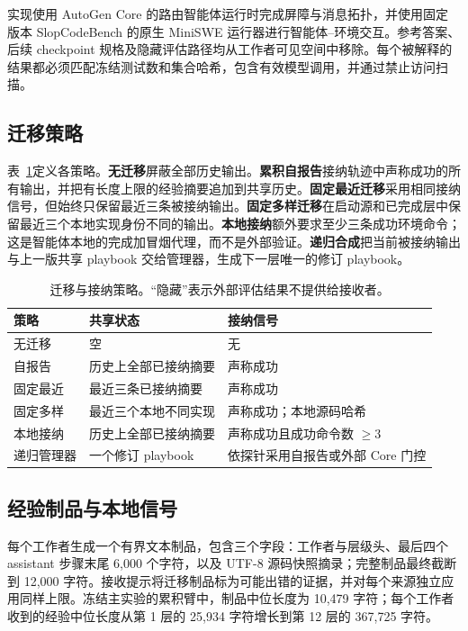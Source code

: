 \documentclass[UTF8,letterpaper,10pt,twocolumn]{ctexart}
\begin{document}
实现使用 AutoGen Core 的路由智能体运行时完成屏障与消息拓扑，并使用固定版本 SlopCodeBench 的原生 MiniSWE 运行器进行智能体--环境交互。参考答案、后续 checkpoint 规格及隐藏评估路径均从工作者可见空间中移除。每个被解释的结果都必须匹配冻结测试数和集合哈希，包含有效模型调用，并通过禁止访问扫描。

\subsection{迁移策略}

表~\ref{tab:policies-zh}定义各策略。\textbf{无迁移}屏蔽全部历史输出。\textbf{累积自报告}接纳轨迹中声称成功的所有输出，并把有长度上限的经验摘要追加到共享历史。\textbf{固定最近迁移}采用相同接纳信号，但始终只保留最近三条被接纳输出。\textbf{固定多样迁移}在启动源和已完成层中保留最近三个本地实现身份不同的输出。\textbf{本地接纳}额外要求至少三条成功环境命令；这是智能体本地的完成加冒烟代理，而不是外部验证。\textbf{递归合成}把当前被接纳输出与上一版共享 playbook 交给管理器，生成下一层唯一的修订 playbook。

\begin{table}[t]
\centering
\caption{迁移与接纳策略。“隐藏”表示外部评估结果不提供给接收者。}
\label{tab:policies-zh}
\begin{tabular}{p{}p{}p{}}
\toprule
策略 & 共享状态 & 接纳信号 \\
\midrule
无迁移 & 空 & 无 \\
自报告 & 历史上全部已接纳摘要 & 声称成功 \\
固定最近 & 最近三条已接纳摘要 & 声称成功 \\
固定多样 & 最近三个本地不同实现 & 声称成功；本地源码哈希 \\
本地接纳 & 历史上全部已接纳摘要 & 声称成功且成功命令数 $\geq3$ \\
递归管理器 & 一个修订 playbook & 依探针采用自报告或外部 Core 门控 \\
\bottomrule
\end{tabular}
\end{table}

\subsection{经验制品与本地信号}

每个工作者生成一个有界文本制品，包含三个字段：工作者与层级头、最后四个 assistant 步骤末尾 6,000 个字符，以及 UTF-8 源码快照摘录；完整制品最终截断到 12,000 字符。接收提示将迁移制品标为可能出错的证据，并对每个来源独立应用同样上限。冻结主实验的累积臂中，制品中位长度为 10,479 字符；每个工作者收到的经验中位长度从第 1 层的 25,934 字符增长到第 12 层的 367,725 字符。
\end{document}
